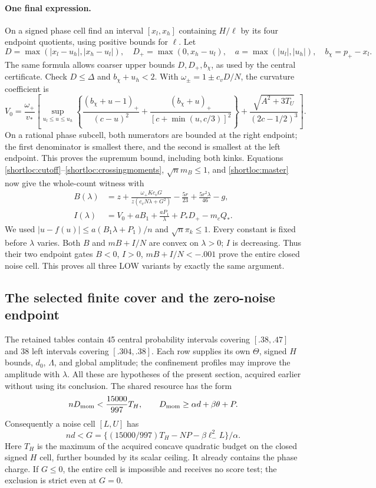 \paragraph{One final expression.}
On a signed phase cell find an interval $[x_l,x_h]$ containing $H/\ell$
by its four endpoint quotients, using positive bounds for $\ell$.
Let
\[
 D=\max(|x_l-u_h|,|x_h-u_l|),\quad
 D_+=\max(0,x_h-u_l),\quad a=\max(|u_l|,|u_h|),\quad b_\chi=p_+-x_l.
\]
The same formula allows coarser upper bounds $D,D_+,b_\chi$, as used by
the central certificate. Check $D\le\Delta$ and $b_\chi+u_h<2$.
With $\omega_\pm=1\pm c_vD/N$, the curvature coefficient is
\begin{equation}\label{shortloc:V}
 V_0=\frac{\omega_+}{v_*}\left[
 \sup_{u_l\le u\le u_h}\left\{
 \frac{(b_\chi+u-1)_+}{(c-u)^2}
 +\frac{(b_\chi+u)_+}{[c+\min(u,c/3)]^2}\right\}
 +\frac{\sqrt{A^2+3T_U}}{(2c-1/2)^3}\right].
\end{equation}
On a rational phase subcell, both numerators are bounded at the right
endpoint; the first denominator is smallest there, and the second is
smallest at the left endpoint. This proves the supremum bound, including
both kinks. Equations \eqref{shortloc:cutoff}--\eqref{shortloc:crossingmoments},
$\sqrt n m_B\le1$, and \eqref{shortloc:master} now give the whole-count
witness with
\begin{align}\label{shortloc:BI}
 B(\lambda)&=z+\frac{\omega_+Kc_vG}{z(c_vN\lambda+G^2)}
                      -\frac{5r}{23}+\frac{5r^2\lambda}{46}-g,\\
 I(\lambda)&=V_0+aB_1+\frac{aP_1}{\lambda}+P_*D_+-m_cQ_*.
 \nonumber
\end{align}
We used $|u-f(u)|\le a(B_1\lambda+P_1)/n$ and $\sqrt n\pi_k\le1$.
Every constant is fixed before $\lambda$ varies. Both $B$ and
$mB+I/N$ are convex on $\lambda>0$; $I$ is decreasing. Thus their two
endpoint gates $B<0$, $I>0$, $mB+I/N<-.001$ prove the entire closed noise
cell. This proves all three LOW variants by exactly the same argument.

\subsection{The selected finite cover and the zero-noise endpoint}

The retained tables contain 45 central probability intervals covering
$[.38,.47]$ and 38 left intervals covering $[.304,.38]$. Each row supplies
its own $\Theta$, signed $H$ bounds, $d_0$, $\Lambda$, and global amplitude;
the confinement profiles may improve the amplitude with $\lambda$.
All these are hypotheses of the present section, acquired earlier without
using its conclusion. The shared resource has the form
\[
 nD_{\rm mom}<\frac{15000}{997}T_H,\qquad
 D_{\rm mom}\ge\alpha d+\beta\theta+P.
\]
Consequently a noise cell $[L,U]$ has
\[
 nd<G=\{(15000/997)T_H-NP-\beta\ell_-^2L\}/\alpha.
\]
Here $T_H$ is the maximum of the acquired concave quadratic budget on the
closed signed $H$ cell, further bounded by its scalar ceiling. It already
contains the phase charge. If $G\le0$, the entire cell is impossible and
receives no score test; the exclusion is strict even at $G=0$.

